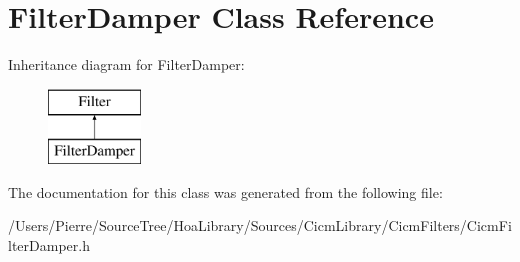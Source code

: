 \hypertarget{class_filter_damper}{\section{Filter\-Damper Class Reference}
\label{class_filter_damper}
}
Inheritance diagram for Filter\-Damper\-:\begin{figure}[H]
\begin{center}
\leavevmode
\includegraphics[height=2.000000cm]{class_filter_damper}
\end{center}
\end{figure}


The documentation for this class was generated from the following file\-:\begin{DoxyCompactItemize}
\item 
/\-Users/\-Pierre/\-Source\-Tree/\-Hoa\-Library/\-Sources/\-Cicm\-Library/\-Cicm\-Filters/Cicm\-Filter\-Damper.\-h\end{DoxyCompactItemize}
